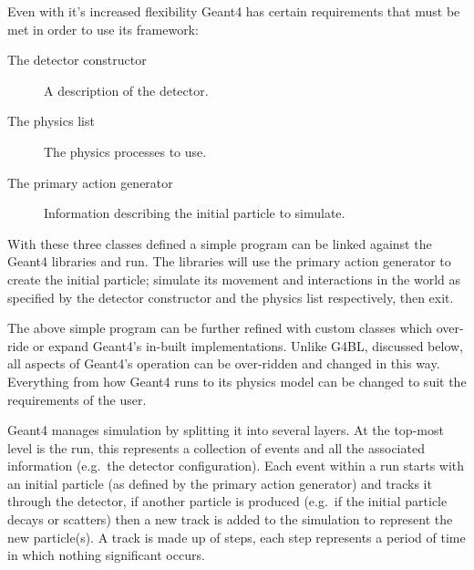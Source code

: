 Even with it's increased flexibility Geant4 has certain requirements that must be met in order to use its framework:
\begin{description}
  \item[The detector constructor] A description of the detector.
  \item[The physics list] The physics processes to use.
  \item[The primary action generator] Information describing the initial particle to simulate.
\end{description}
With these three classes defined a simple program can be linked against the Geant4 libraries and run. The libraries will use the primary action generator to create the initial particle; simulate its movement and interactions in the world as specified by the detector constructor and the physics list respectively, then exit.

The above simple program can be further refined with custom classes which over-ride or expand Geant4's in-built implementations. Unlike G4BL, discussed below, all aspects of Geant4's operation can be over-ridden and changed in this way. Everything from how Geant4 runs to its physics model can be changed to suit the requirements of the user.

Geant4 manages simulation by splitting it into several layers. At the top-most level is the run, this represents a collection of events and all the associated information (e.g.\ the detector configuration). Each event within a run starts with an initial particle (as defined by the primary action generator) and tracks it through the detector, if another particle is produced (e.g.\ if the initial particle decays or scatters) then a new track is added to the simulation to represent the new particle(s). A track is made up of steps, each step represents a period of time in which nothing significant occurs.

